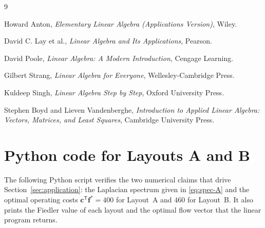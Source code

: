 \documentclass[11pt,a4paper]{article}
\newcommand{\vect}[1]{\mathbf{#1}}
\newcommand{\transpose}{^{\mathsf{T}}}
\begin{document}
\begin{thebibliography}{9}

Howard Anton,
\emph{Elementary Linear Algebra (Applications Version)},
Wiley.

David C. Lay et al.,
\emph{Linear Algebra and Its Applications},
Pearson.

David Poole,
\emph{Linear Algebra: A Modern Introduction},
Cengage Learning.

Gilbert Strang,
\emph{Linear Algebra for Everyone},
Wellesley-Cambridge Press.

Kuldeep Singh,
\emph{Linear Algebra Step by Step},
Oxford University Press.

Stephen Boyd and Lieven Vandenberghe,
\emph{Introduction to Applied Linear Algebra: Vectors, Matrices, and
Least Squares},
Cambridge University Press.


\end{thebibliography}

\appendix
\section{Python code for Layouts A and B}
\label{annex:python}

The following Python script verifies the two numerical claims that
drive Section~\ref{sec:application}: the Laplacian spectrum given in
\eqref{eq:spec-A} and the optimal operating costs $\vect{c}\transpose
\vect{f}^{*} = 400$ for Layout~A and $460$ for Layout~B. It also
prints the Fiedler value of each layout and the optimal flow vector
that the linear program returns.
\end{document}
